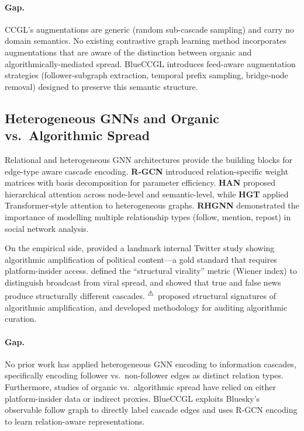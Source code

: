 \documentclass[12pt,a4paper]{article}
\newcommand{\flagcite}[1]{%
  {\color{orange}\textsuperscript{⚠}}\,#1%
}
\begin{document}
\paragraph{Gap.}
CCGL's augmentations are generic (random sub-cascade sampling) and carry no
domain semantics.  No existing contrastive graph learning method incorporates
augmentations that are aware of the distinction between organic and
algorithmically-mediated spread.  BlueCCGL introduces feed-aware augmentation
strategies (follower-subgraph extraction, temporal prefix sampling,
bridge-node removal) designed to preserve this semantic structure.

\subsection{Heterogeneous GNNs and Organic vs.\ Algorithmic Spread}

Relational and heterogeneous GNN architectures provide the building blocks
for edge-type aware cascade encoding.  \textbf{R-GCN}
\citep{schlichtkrull2018rgcn} introduced relation-specific weight matrices
with basis decomposition for parameter efficiency.  \textbf{HAN}
\citep{wang2019han} proposed hierarchical attention across node-level and
semantic-level, while \textbf{HGT} \citep{hu2020hgt} applied
Transformer-style attention to heterogeneous graphs.  \textbf{RHGNN}
\citep{yu2023rhgnn} demonstrated the importance of modelling multiple
relationship types (follow, mention, repost) in social network analysis.

On the empirical side, \citet{huszar2022twitter} provided a landmark internal
Twitter study showing algorithmic amplification of political content---a gold
standard that requires platform-insider access.  \citet{goel2016structural}
defined the ``structural virality'' metric (Wiener index) to distinguish
broadcast from viral spread, and \citet{vosoughi2018spread} showed that true
and false news produce structurally different cascades.
\flagcite{\citet{bhadani2024amplification}} proposed structural signatures of
algorithmic amplification, and \citet{bandy2021auditing} developed methodology
for auditing algorithmic curation.

\paragraph{Gap.}
No prior work has applied heterogeneous GNN encoding to information cascades,
specifically encoding follower vs.\ non-follower edges as distinct relation
types.  Furthermore, studies of organic vs.\ algorithmic spread have relied on
either platform-insider data \citep{huszar2022twitter} or indirect proxies.
BlueCCGL exploits Bluesky's observable follow graph to directly label cascade
edges and uses R-GCN encoding to learn relation-aware representations.
\end{document}
